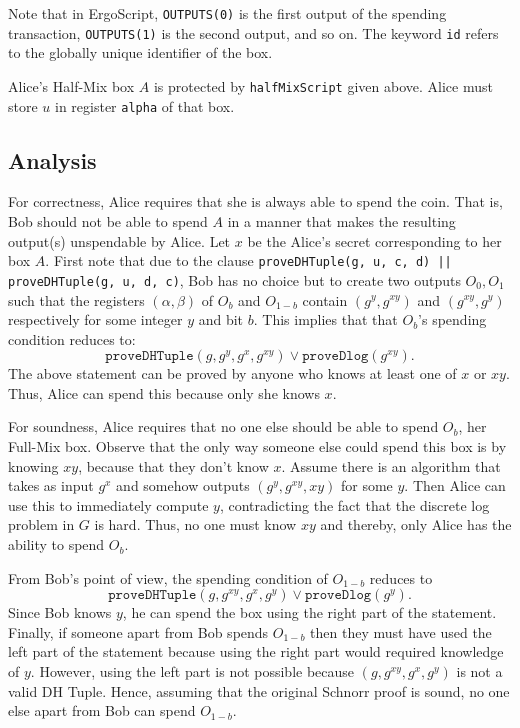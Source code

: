 \documentclass[runningheads]{llncs}
\newcommand{\langname}{ErgoScript\xspace}
\begin{document}
Note that in \langname, \texttt{OUTPUTS(0)} is the first output of the spending transaction, \texttt{OUTPUTS(1)} is the second output, and so on. The keyword \texttt{id} refers to the globally unique identifier of the box. 

Alice's Half-Mix box $A$ is protected by \texttt{halfMixScript} given above. Alice must store $u$ in register \texttt{alpha} of that box.


\subsection{Analysis}

For correctness, Alice requires that she is always able to spend the coin. That is, Bob should not be able to spend $A$ in a manner that makes the resulting output(s) unspendable by Alice.
Let $x$ be the Alice's secret corresponding to her box $A$. First note that due to the clause 
\texttt{proveDHTuple(g, u, c, d) || proveDHTuple(g, u, d, c)}, Bob has no choice but to create two outputs $O_0, O_1$ such that the registers $(\alpha, \beta)$ of $O_b$ and $O_{1-b}$ contain $(g^y, g^{xy})$ and $(g^{xy}, g^y)$ respectively for some integer $y$ and bit $b$. This implies that that $O_b$'s spending condition reduces to:
$$\texttt{proveDHTuple}(g, g^{y}, g^x, g^{xy}) \lor \texttt{proveDlog}(g^{xy}).$$ 
The above statement can be proved by anyone who knows at least one of $x$ or $xy$. 
Thus, Alice can spend this because only she knows $x$. 

For soundness, Alice requires that no one else should be able to spend $O_b$, her Full-Mix box. Observe that the only way someone else could spend this box is by knowing $xy$, because that they don't know $x$. Assume there is an algorithm that takes as input $g^x$ and somehow outputs $(g^y, g^{xy}, xy)$ for some $y$. Then Alice can use this to immediately compute $y$, contradicting the fact that the discrete log problem in $G$ is hard. Thus, no one must know $xy$ and thereby, only Alice has the ability to spend $O_b$.

From Bob's point of view, the spending condition of $O_{1-b}$ reduces to 
$$\texttt{proveDHTuple}(g, g^{xy}, g^x, g^{y}) \lor \texttt{proveDlog}(g^{y}).$$
Since Bob knows $y$, he can spend the box using the right part of the statement. Finally, if someone apart from Bob spends $O_{1-b}$ then they must have used the left part of the statement because using the right part would required knowledge of $y$. However, using the left part is not possible because $(g, g^{xy}, g^x, g^{y})$ is not a valid DH Tuple. Hence, assuming that the original Schnorr proof is sound, no one else apart from Bob can spend $O_{1-b}$.
\end{document}
